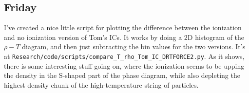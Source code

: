 \documentclass[11pt,letterpaper]{article}
\begin{document}
\subsection*{Friday}
I've created a nice little script for plotting the difference between the 
ionization and no ionization version of Tom's ICs.  It works by doing a 2D
histogram of the $\rho-T$ diagram, and then just subtracting the bin values for
the two versions.  It's at 
\verb!Research/code/scripts/compare_T_rho_Tom_IC_DRTFORCE2.py!.  As it shows, 
there is some interesting stuff going on, where the ionization seems to be 
upping the density in the S-shaped part of the phase diagram, while also 
depleting the highest density chunk of the high-temperature string of particles.
\end{document}
